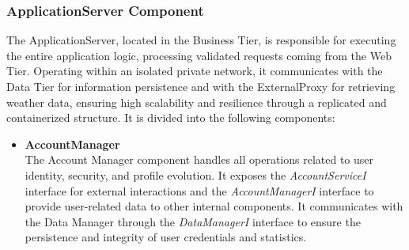 \subsubsection{ApplicationServer Component}
The ApplicationServer, located in the Business Tier, is responsible for executing the entire application logic, processing validated requests coming from the Web Tier. Operating within an isolated private network, it communicates with the Data Tier for information persistence and with the ExternalProxy for retrieving weather data, ensuring high scalability and resilience through a replicated and containerized structure. It is divided into the following components:

\begin{itemize}
    \item \textbf{AccountManager}\vspace{0.3mm}\\
    The Account Manager component handles all operations related to user identity, security, and profile evolution. It exposes the \textit{AccountServiceI} interface for external interactions and the \textit{AccountManagerI} interface to provide user-related data to other internal components. It communicates with the Data Manager through the \textit{DataManagerI} interface to ensure the persistence and integrity of user credentials and statistics.


\end{itemize}

